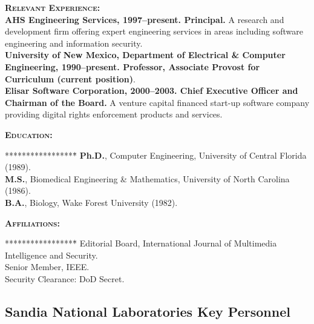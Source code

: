 \documentclass{sbir}
\begin{document}
{{\vspace{-6pt}
\textbf{\textsc{Relevant Experience:}}~\\
{\bfseries AHS Engineering Services, 1997--present. Principal.} A research and development firm offering expert engineering services in areas including software engineering and information security.~\\
{\bfseries University of New Mexico, Department of Electrical \& Computer Engineering, 1990--present. Professor, Associate Provost for Curriculum (current position)}.~\\
{\bfseries Elisar Software Corporation, 2000--2003. Chief Executive Officer and Chairman of the Board.} A venture capital financed start-up software company providing digital rights enforcement products and services.

\vspace{-6pt}
\textbf{\textsc{Education:}}
\vspace{-30pt}
\begin{tabbing}*****************\=\kill
 \> {\bfseries Ph.D.}, Computer Engineering, University of Central Florida (1989). \\
 \> {\bfseries M.S.}, Biomedical Engineering \& Mathematics, University of North Carolina (1986). \\
 \> {\bfseries B.A.}, Biology, Wake Forest University (1982).
\end{tabbing}

\vspace{-12pt}
\textbf{\textsc{Affiliations:}}
\vspace{-30pt}
\begin{tabbing}*****************\=\kill
\> Editorial Board,  International Journal of Multimedia Intelligence and Security. \\
\> Senior Member, IEEE. \\
\> Security Clearance: DoD Secret.
\end{tabbing}
\vspace{-12pt}

\subsection{Sandia National Laboratories Key Personnel}

}}
\end{document}
